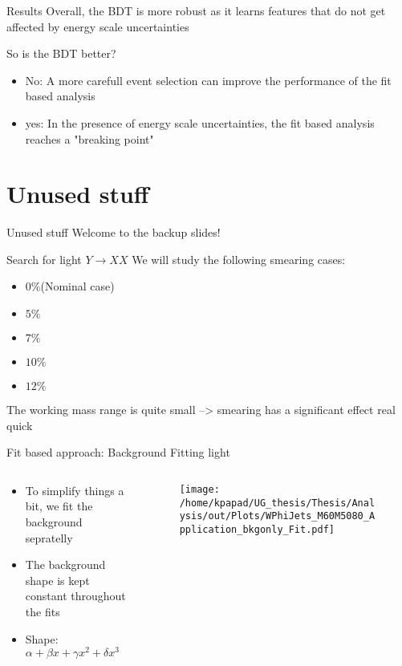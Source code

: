 \documentclass[bigger]{beamer}
\begin{document}
\begin{frame}[label={sec:orgc247171}]{Results}
Overall, the BDT is more robust as it learns features that do not get affected by energy scale uncertainties\newline

\alert{So is the BDT better?}
\begin{itemize}
\item No: A more carefull event selection can improve the performance of the fit based analysis
\item yes: In the presence of energy scale uncertainties, the fit based analysis reaches a "breaking point"
\end{itemize}
\end{frame}

\section{Unused stuff}
\label{sec:org3c991c9}
\begin{frame}[label={sec:orga91dafb}]{Unused stuff}
\alert{Welcome to the backup slides!}
\end{frame}

\begin{frame}[label={sec:org3815b79}]{Search for light \(Y \rightarrow XX\)}
We will study the following smearing cases:
\begin{itemize}
\item \(0\%\)(Nominal case)
\item \(5\%\)
\item \(7\%\)
\item \(10\%\)
\item \(12\%\)
\end{itemize}
The working mass range is quite small --> smearing has a significant effect real quick 
\end{frame}
\begin{frame}[label={sec:org0739f52}]{Fit based approach: Background Fitting light}
\begin{columns}
\begin{column}{0.5\columnwidth}
\begin{itemize}
\item To simplify things a bit, we fit the background sepratelly
\item The background shape is kept constant throughout the fits
\item Shape: \(\alpha + \beta x + \gamma x^2 + \delta x^3\)
\end{itemize}
\end{column}
\begin{column}{0.5\columnwidth}
\begin{figure}[h]
\centering
\texttt{[image: /home/kpapad/UG\_thesis/Thesis/Analysis/out/Plots/WPhiJets\_M60M5080\_Application\_bkgonly\_Fit.pdf]}
\end{figure}
\end{column}
\end{columns}
\end{frame}
\end{document}
